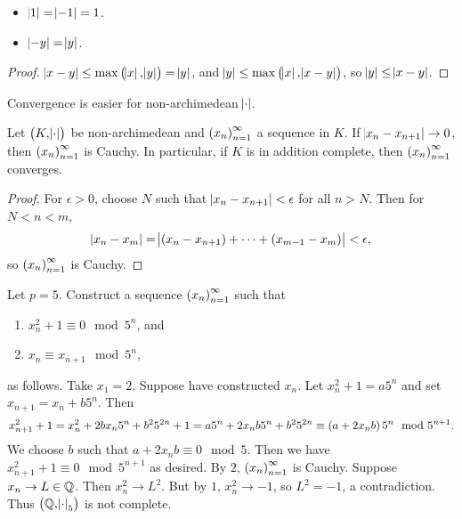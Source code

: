 \begin{fact*}
\hfill
\begin{itemize}
\item $ \abs{1} = \abs{-1} = 1 $.
\item $ \abs{-y} = \abs{y} $.
\end{itemize}
\end{fact*}

\begin{proof}
$ \abs{x - y} \le \max\br{\abs{x}, \abs{y}} = \abs{y} $, and $ \abs{y} \le \max\br{\abs{x}, \abs{x - y}} $, so $ \abs{y} \le \abs{x - y} $.
\end{proof}

Convergence is easier for non-archimedean $ \abs{\cdot} $.

\begin{proposition}
Let $ \br{K, \abs{\cdot}} $ be non-archimedean and $ \br{x_n}_{n = 1}^\infty $ a sequence in $ K $. If $ \abs{x_n - x_{n + 1}} \to 0 $, then $ \br{x_n}_{n = 1}^\infty $ is Cauchy. In particular, if $ K $ is in addition complete, then $ \br{x_n}_{n = 1}^\infty $ converges.
\end{proposition}

\begin{proof}
For $ \epsilon > 0 $, choose $ N $ such that $ \abs{x_n - x_{n + 1}} < \epsilon $ for all $ n > N $. Then for $ N < n < m $,
$$ \abs{x_n - x_m} = \abs{\br{x_n - x_{n + 1}} + \dots + \br{x_{m - 1} - x_m}} < \epsilon, $$
so $ \br{x_n}_{n = 1}^\infty $ is Cauchy.
\end{proof}

\pagebreak

\begin{example*}
Let $ p = 5 $. Construct a sequence $ \br{x_n}_{n = 1}^\infty $ such that
\begin{enumerate}
\item $ x_n^2 + 1 \equiv 0 \mod 5^n $, and
\item $ x_n \equiv x_{n + 1} \mod 5^n $,
\end{enumerate}
as follows. Take $ x_1 = 2 $. Suppose have constructed $ x_n $. Let $ x_n^2 + 1 = a5^n $ and set $ x_{n + 1} = x_n + b5^n $. Then
$$ x_{n + 1}^2 + 1 = x_n^2 + 2bx_n5^n + b^25^{2n} + 1 = a5^n + 2x_nb5^n + b^25^{2n} \equiv \br{a + 2x_nb}5^n \mod 5^{n + 1}. $$
We choose $ b $ such that $ a + 2x_nb \equiv 0 \mod 5 $. Then we have $ x_{n + 1}^2 + 1 \equiv 0 \mod 5^{n + 1} $ as desired. By $ 2 $, $ \br{x_n}_{n = 1}^\infty $ is Cauchy. Suppose $ x_n \to L \in \mathbb{Q} $. Then $ x_n^2 \to L^2 $. But by $ 1 $, $ x_n^2 \to -1 $, so $ L^2 = -1 $, a contradiction. Thus $ \br{\QQ, \abs{\cdot}_5} $ is not complete.
\end{example*}

